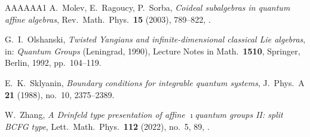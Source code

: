 \documentclass{amsart}
\numberwithin{equation}{section}
\theoremstyle{remark}
\renewcommand{\,}{\kern 0.1em} %
\begin{document}
\begin{thebibliography}{AAAAAA1}
	A.~Molev, E.~Ragoucy, P.~Sorba,
	{\it Coideal subalgebras in quantum affine algebras},
	Rev.~Math.~Phys.~{\bf 15} (2003), 789--822,
	.

	G.~I.~Olshanski,
	{\it Twisted Yangians and infinite-dimensional classical Lie algebras},
	in: {\it Quantum Groups} (Leningrad, 1990), Lecture Notes in Math.~{\bf 1510}, Springer, Berlin, 1992, pp.~104--119.

	E.~K.~Sklyanin,
	{\it Boundary conditions for integrable quantum systems},
	J.~Phys.~A {\bf 21} (1988), no.~10, 2375--2389.

	W.~Zhang,
	{\it A Drinfeld type presentation of affine $\imath$quantum groups II: split BCFG type},
	Lett.~Math.~Phys.~{\bf 112} (2022), no.~5, 89,
	.


\end{thebibliography}
\end{document}
